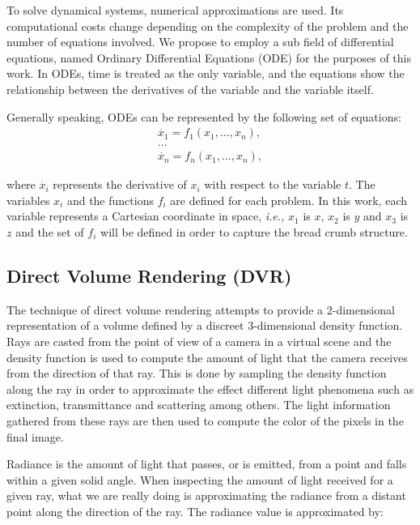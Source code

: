 \documentclass[oneside,a4paper,english,links]{amca}
\begin{document}
To solve dynamical systems, numerical approximations are used. Its computational costs change depending on the complexity of the problem and the number of equations involved. We propose to employ a sub field of differential equations, named Ordinary Differential Equations (ODE) for the purposes of this work. In ODEs, time is treated as the only variable, and the equations show the relationship between the derivatives of the variable and the variable itself. 

Generally speaking, ODEs can be represented by the following set of equations:
\begin{equation} \label{eq:simple}  
\begin{aligned}
\dot{x_{1}} = f_{1}(x_{1},\ldots,x_{n}),\\
\ldots\\
\dot{x_{n}} = f_{n}(x_{1},\ldots,x_{n}),
\end{aligned}
\end{equation}

where $\dot{x_{i}}$ represents the derivative of $x_{i}$ with respect to the variable $t$. The variables $x_{i}$ and the functions $f_{i}$ are defined for each problem. In this work, each variable represents a Cartesian coordinate in space, {\em i.e.,} $x_{1}$ is $x$, $x_{2}$ is $y$ and $x_{3}$ is $z$ and the set of $f_{i}$ will be defined in order to capture the bread crumb structure.


\subsection{Direct Volume Rendering (DVR)}

The technique of direct volume rendering attempts to provide a
2-dimensional representation of a volume defined by a discreet
3-dimensional density function. Rays are casted from the point of view
of a camera in a virtual scene and the density function is used to
compute the amount of light that the camera receives from the
direction of that ray. This is done by sampling the density function
along the ray in order to approximate the effect different light
phenomena such as extinction, transmittance and scattering among
others. The light information gathered from these rays are then used
to compute the color of the pixels in the final image.

Radiance is the amount of light that passes, or is emitted, from a
point and falls within a given solid angle. When inspecting the amount
of light received for a given ray, what we are really doing is
approximating the radiance from a distant point along the direction of
the ray. The radiance value is approximated by: 
\end{document}
